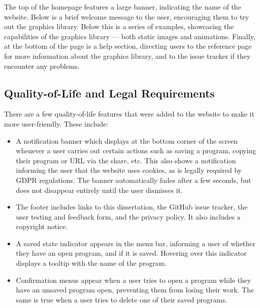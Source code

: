 \documentclass[../main.tex]{subfiles}
\begin{document}
            The top of the homepage features a large banner, indicating the name of the
                website.
            Below is a brief welcome message to the user, encouraging them to try out the
                graphics library.
            Below this is a series of examples, showcasing the capabilities of the graphics
                library — both static images and animations.
            Finally, at the bottom of the page is a help section, directing users to the
                reference page for more information about the graphics library, and to the
                issue tracker if they encounter any problems.

        \subsection{Quality-of-Life and Legal Requirements}
            There are a few quality-of-life features that were added to the website to make
                it more user-friendly.
            These include:
            \begin{itemize}
                \item A notification banner which displays at the bottom corner of the screen
                      whenever a user carries out certain actions such as saving a program, copying
                      their program or URL via the share, etc.
                      This also shows a notification informing the user that the website uses
                          cookies, as is legally required by GDPR regulations.
                      The banner automatically fades after a few seconds, but does not disappear
                          entirely until the user dismisses it.
                \item The footer includes links to this dissertation, the GitHub issue tracker,
                      the user testing and feedback form, and the privacy policy.
                      It also includes a copyright notice.
                \item A saved state indicator appears in the menu bar, informing a user of whether
                      they have an open program, and if it is saved.
                      Hovering over this indicator displays a tooltip with the name of the program.
                \item Confirmation menus appear when a user tries to open a program while they
                      have an unsaved program open, preventing them from losing their work.
                      The same is true when a user tries to delete one of their saved programs.
            \end{itemize}
\end{document}
